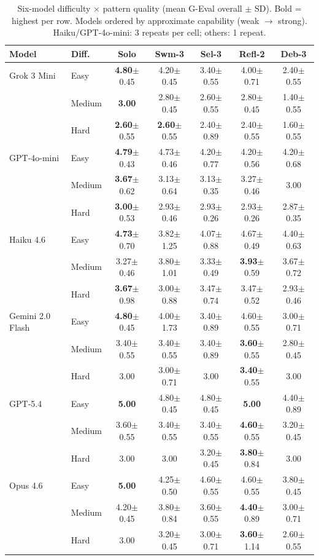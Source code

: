 \begin{table}[t]
\centering
\caption{Six-model difficulty $\times$ pattern quality (mean G-Eval overall $\pm$ SD). Bold = highest per row. Models ordered by approximate capability (weak $\to$ strong). Haiku/GPT-4o-mini: 3 repeats per cell; others: 1 repeat.}
\label{tab:difficulty_6model}
\vspace{-2mm}
{\footnotesize
\begin{tabular}{@{}llccccc@{}}
\toprule
\textbf{Model} & \textbf{Diff.} & \textbf{Solo} & \textbf{Swm-3} & \textbf{Sel-3} & \textbf{Refl-2} & \textbf{Deb-3} \\
\midrule
Grok 3 Mini & Easy & \textbf{4.80}$\pm$0.45 & 4.20$\pm$0.45 & 3.40$\pm$0.55 & 4.00$\pm$0.71 & 2.40$\pm$0.55 \\
 & Medium & \textbf{3.00} & 2.80$\pm$0.45 & 2.60$\pm$0.55 & 2.80$\pm$0.45 & 1.40$\pm$0.55 \\
 & Hard & \textbf{2.60}$\pm$0.55 & \textbf{2.60}$\pm$0.55 & 2.40$\pm$0.89 & 2.40$\pm$0.55 & 1.60$\pm$0.55 \\
\midrule
GPT-4o-mini & Easy & \textbf{4.79}$\pm$0.43 & 4.73$\pm$0.46 & 4.20$\pm$0.77 & 4.20$\pm$0.56 & 4.20$\pm$0.68 \\
 & Medium & \textbf{3.67}$\pm$0.62 & 3.13$\pm$0.64 & 3.13$\pm$0.35 & 3.27$\pm$0.46 & 3.00 \\
 & Hard & \textbf{3.00}$\pm$0.53 & 2.93$\pm$0.46 & 2.93$\pm$0.26 & 2.93$\pm$0.26 & 2.87$\pm$0.35 \\
\midrule
Haiku 4.6 & Easy & \textbf{4.73}$\pm$0.70 & 3.82$\pm$1.25 & 4.07$\pm$0.88 & 4.67$\pm$0.49 & 4.40$\pm$0.63 \\
 & Medium & 3.27$\pm$0.46 & 3.80$\pm$1.01 & 3.33$\pm$0.49 & \textbf{3.93}$\pm$0.59 & 3.67$\pm$0.72 \\
 & Hard & \textbf{3.67}$\pm$0.98 & 3.00$\pm$0.88 & 3.47$\pm$0.74 & 3.47$\pm$0.52 & 2.93$\pm$0.46 \\
\midrule
Gemini 2.0 Flash & Easy & \textbf{4.80}$\pm$0.45 & 4.00$\pm$1.73 & 3.40$\pm$0.89 & 4.60$\pm$0.55 & 3.00$\pm$0.71 \\
 & Medium & 3.40$\pm$0.55 & 3.40$\pm$0.55 & 3.40$\pm$0.89 & \textbf{3.60}$\pm$0.55 & 2.80$\pm$0.45 \\
 & Hard & 3.00 & 3.00$\pm$0.71 & 3.00 & \textbf{3.40}$\pm$0.55 & 3.00 \\
\midrule
GPT-5.4 & Easy & \textbf{5.00} & 4.80$\pm$0.45 & 4.80$\pm$0.45 & \textbf{5.00} & 4.40$\pm$0.89 \\
 & Medium & 3.60$\pm$0.55 & 3.40$\pm$0.55 & 3.40$\pm$0.55 & \textbf{4.60}$\pm$0.55 & 3.20$\pm$0.45 \\
 & Hard & 3.00 & 3.00 & 3.20$\pm$0.45 & \textbf{3.80}$\pm$0.84 & 3.00 \\
\midrule
Opus 4.6 & Easy & \textbf{5.00} & 4.25$\pm$0.50 & 4.60$\pm$0.55 & 4.60$\pm$0.55 & 3.80$\pm$0.45 \\
 & Medium & 4.20$\pm$0.45 & 3.80$\pm$0.84 & 3.60$\pm$0.55 & \textbf{4.40}$\pm$0.89 & 3.00$\pm$0.71 \\
 & Hard & 3.00 & 3.20$\pm$0.45 & 3.00$\pm$0.71 & \textbf{3.60}$\pm$1.14 & 2.60$\pm$0.55 \\
\bottomrule
\end{tabular}
}
\end{table}